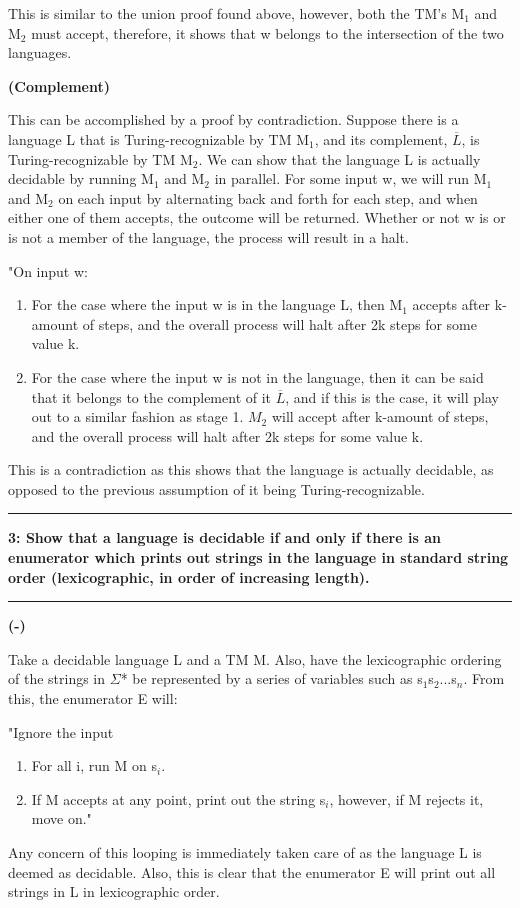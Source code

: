 \documentclass[11pt]{article}
\newcommand\question[2]{\vspace{.25in}\hrule\textbf{#1: #2}\vspace{.5em}\hrule\vspace{.10in}}
\renewcommand\part[1]{\vspace{.10in}\textbf{(#1)}\par}
\begin{document}
		This is similar to the union proof found above, however, both the TM's M$_{1}$ and M$_{2}$ must accept, therefore, it shows that w belongs to the intersection of the two languages.
		
	\part{Complement}
		This can be accomplished by a proof by contradiction. Suppose there is a language L that is Turing-recognizable by TM M$_{1}$, and its complement, $\overline{L}$, is Turing-recognizable by TM M$_{2}$. We can show that the language L is actually decidable by running M$_{1}$ and M$_{2}$ in parallel. For some input w, we will run M$_{1}$ and M$_{2}$ on each input by alternating back and forth for each step, and when either one of them accepts, the outcome will be returned. Whether or not w is or is not a member of the language, the process will result in a halt.\par
		"On input w:
		\begin{enumerate}
			\item For the case where the input w is in the language L, then M$_{1}$ accepts after k-amount of steps, and the overall process will halt after 2k steps for some value k.
			\item For the case where the input w is not in the language, then it can be said that it belongs to the complement of it $\overline{L}$, and if this is the case, it will play out to a similar fashion as stage 1. $M_{2}$ will accept after k-amount of steps, and the overall process will halt after 2k steps for some value k.
		\end{enumerate}
		This is a contradiction as this shows that the language is actually decidable, as opposed to the previous assumption of it being Turing-recognizable.
		
\question{3}{Show that a language is decidable if and only if there is an enumerator which prints out strings in the language in standard string order (lexicographic, in order of increasing length).}
	\part{-}
	Take a decidable language L and a TM M. Also, have the lexicographic ordering of the strings in $\Sigma$* be represented by a series of variables such as s$_{1}$s$_{2}$...s$_{n}$. From this, the enumerator E will:\par
	"Ignore the input
	\begin{enumerate}
		\item For all i, run M on s$_{i}$. 
		\item If M accepts at any point, print out the string s$_{i}$, however, if M rejects it, move on."
	\end{enumerate}
	Any concern of this looping is immediately taken care of as the language L is deemed as decidable. Also, this is clear that the enumerator E will print out all strings in L in lexicographic order.\par
	
\end{document}
